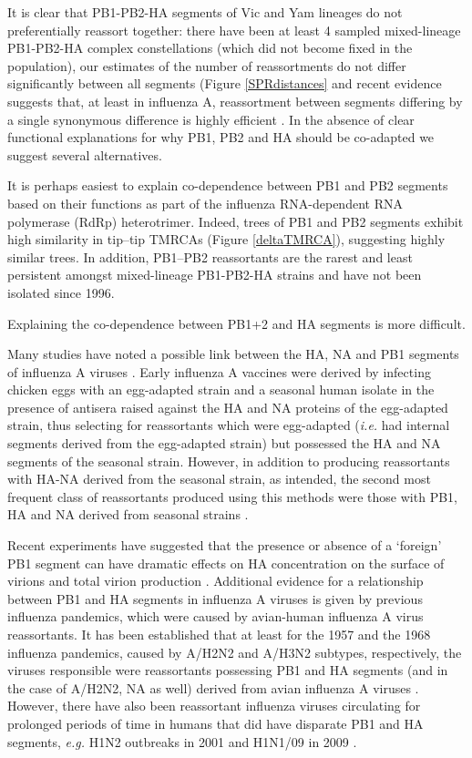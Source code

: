 \documentclass[11pt,oneside,letterpaper]{article}
\begin{document}
It is clear that PB1-PB2-HA segments of Vic and Yam lineages do not preferentially reassort together: there have been at least 4 sampled mixed-lineage PB1-PB2-HA complex constellations (which did not become fixed in the population), our estimates of the number of reassortments do not differ significantly between all segments (Figure \ref{SPRdistances} and recent evidence suggests that, at least in influenza A, reassortment between segments differing by a single synonymous difference is highly efficient \cite{marshall2013}.
In the absence of clear functional explanations for why PB1, PB2 and HA should be co-adapted we suggest several alternatives.

It is perhaps easiest to explain co-dependence between PB1 and PB2 segments based on their functions as part of the influenza RNA-dependent RNA polymerase (RdRp) heterotrimer.
Indeed, trees of PB1 and PB2 segments exhibit high similarity in tip--tip TMRCAs (Figure \ref{deltaTMRCA}), suggesting highly similar trees.
In addition, PB1--PB2 reassortants are the rarest and least persistent amongst mixed-lineage PB1-PB2-HA strains and have not been isolated since 1996.

Explaining the co-dependence between PB1+2 and HA segments is more difficult.

Many studies have noted a possible link between the HA, NA and PB1 segments of influenza A viruses \cite{bergeron2010,fulvini2011}.
Early influenza A vaccines were derived by infecting chicken eggs with an egg-adapted strain and a seasonal human isolate in the presence of antisera raised against the HA and NA proteins of the egg-adapted strain, thus selecting for reassortants which were egg-adapted (\textit{i.e.} had internal segments derived from the egg-adapted strain) but possessed the HA and NA segments of the seasonal strain.
However, in addition to producing reassortants with HA-NA derived from the seasonal strain, as intended, the second most frequent class of reassortants produced using this methods were those with PB1, HA and NA derived from seasonal strains \cite{bergeron2010,fulvini2011}.

Recent experiments have suggested that the presence or absence of a `foreign' PB1 segment can have dramatic effects on HA concentration on the surface of virions and total virion production \cite{cobbin2013}.
Additional evidence for a relationship between PB1 and HA segments in influenza A viruses is given by previous influenza pandemics, which were caused by avian-human influenza A virus reassortants.
It has been established that at least for the 1957 and the 1968 influenza pandemics, caused by A/H2N2 and A/H3N2 subtypes, respectively, the viruses responsible were reassortants possessing PB1 and HA segments (and in the case of A/H2N2, NA as well) derived from avian influenza A viruses \cite{kawaoka1989}.
However, there have also been reassortant influenza viruses circulating for prolonged periods of time in humans that did have disparate PB1 and HA segments, \textit{e.g.} H1N2 outbreaks in 2001 \cite{gregory2002} and H1N1/09 in 2009 \cite{smith2009}.
\end{document}
